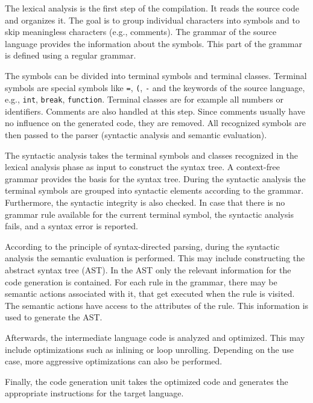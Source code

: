 The lexical analysis is the first step of the compilation. It reads the source code and organizes it. The goal is to group individual characters into symbols and to skip meaningless characters (e.g., comments). The grammar of the source language provides the information about the symbols. This part of the grammar is defined using a regular grammar. 

The symbols can be divided into terminal symbols and terminal classes. Terminal symbols are special symbols like \texttt{=}, \texttt{(}, \texttt{-} and the keywords of the source language, e.g., \texttt{int}, \texttt{break},  \texttt{function}. Terminal classes are for example all numbers or identifiers. Comments are also handled at this step. Since comments usually have no influence on the generated code, they are removed. All recognized symbols are then passed to the parser (syntactic analysis and semantic evaluation). 



The syntactic analysis takes the terminal symbols and classes recognized in the lexical analysis phase as input to construct the syntax tree. A context-free grammar provides the basis for the syntax tree. During the syntactic analysis the terminal symbols are grouped into syntactic elements according to the grammar. Furthermore, the syntactic integrity is also checked. In case that there is no grammar rule available for the current terminal symbol, the syntactic analysis fails, and a syntax error is reported.


According to the principle of syntax-directed parsing, during the syntactic analysis the semantic evaluation is performed. This may include constructing the abstract syntax tree (AST). In the AST only the relevant information for the code generation is contained. For each rule in the grammar, there may be semantic actions associated with it, that get executed when the rule is visited. The semantic actions have access to the attributes of the rule. This information is used to generate the AST.  


Afterwards, the intermediate language code is analyzed and optimized. This may include optimizations such as inlining or loop unrolling. Depending on the use case, more aggressive optimizations can also be performed. 

Finally, the code generation unit takes the optimized code and generates the appropriate instructions for the target language. 